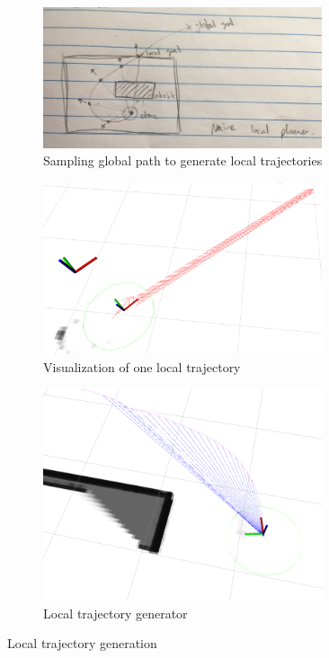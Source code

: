 \documentclass[capstone_report.tex]{subfiles}
\begin{document}
\begin{figure}[H]
    \centering
    \begin{subfigure}{0.33\textwidth}
        \centering
        \includegraphics[width=0.9\textwidth]{imgs/sample_global.jpg}
        \caption{Sampling global path to generate local trajectories}
    \end{subfigure}%
    \begin{subfigure}{0.33\textwidth}
        \centering
        \includegraphics[width=0.9\textwidth]{imgs/one_local_traj.png}
        \caption{Visualization of one local trajectory}
    \end{subfigure}
    \begin{subfigure}{0.33\textwidth}
        \centering
        \includegraphics[width=0.9\textwidth]{imgs/local_traj_gen.png}
        \caption{Local trajectory generator}
    \end{subfigure}
    \caption{Local trajectory generation\label{fig:local_traj_gen}}
\end{figure}
\end{document}
